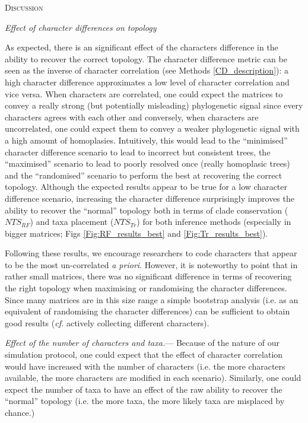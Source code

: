 \documentclass[12pt,letterpaper]{article}
\renewcommand{\section}[1]{%
\bigskip
\begin{center}
\begin{Large}
\normalfont\scshape #1
\medskip
\end{Large}
\end{center}}
\renewcommand{\subsection}[1]{%
\bigskip
\begin{center}
\begin{large}
\normalfont\itshape #1
\end{large}
\end{center}}
\renewcommand{\subsubsection}[1]{%
\vspace{2ex}
\noindent
\textit{#1.}---}
\begin{document}
\section{Discussion}

\subsection{Effect of character differences on topology}
As expected, there is an significant effect of the characters difference in the ability to recover the correct topology.
The character difference metric can be seen as the inverse of character correlation (see Methods \ref{CD_description}): a high character difference approximates a low level of character correlation and vice versa.
When characters are correlated, one could expect the matrices to convey a really strong (but potentially misleading) phylogenetic signal since every characters agrees with each other and conversely, when characters are uncorrelated, one could expect them to convey a weaker phylogenetic signal with a high amount of homoplasies.
Intuitively, this would lead to the ``minimised'' character difference scenario to lead to incorrect but consistent trees, the ``maximised'' scenario to lead to poorly resolved once (really homoplasic trees) and the ``randomised'' scenario to perform the best at recovering the correct topology.
Although the expected results appear to be true for a low character difference scenario, increasing the character difference surprisingly improves the ability to recover the ``normal'' topology both in terms of clade conservation ($NTS_{RF}$) and taxa placement ($NTS_{Tr}$) for both inference methods (especially in bigger matrices; Figs \ref{Fig:RF_results_best} and \ref{Fig:Tr_results_best}).

Following these results, we encourage researchers to code characters that appear to be the most un-correlated \textit{a priori}.
However, it is noteworthy to point that in rather small matrices, there was no significant difference in terms of recovering the right topology when maximising or randomising the character differences.
Since many matrices are in this size range \citep{guillerme2016assessment} a simple bootstrap analysis (i.e. as an equivalent of randomising the character differences) can be sufficient to obtain good results (\textit{cf.} actively collecting different characters).

\subsubsection{Effect of the number of characters and taxa}
Because of the nature of our simulation protocol, one could expect that the effect of character correlation would have increased with the number of characters (i.e. the more characters available, the more characters are modified in each scenario).
Similarly, one could expect the number of taxa to have an effect of the raw ability to recover the ``normal'' topology (i.e. the more taxa, the more likely taxa are misplaced by chance.)
\end{document}
